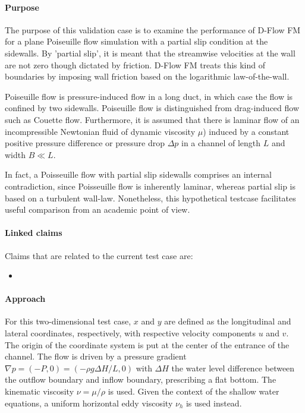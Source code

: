 

\paragraph*{Purpose}
The purpose of this validation case is to examine the performance of D-Flow FM for a plane Poiseuille flow simulation with a partial slip condition at the sidewalls. By 'partial slip', it is meant that the streamwise velocities at the wall are not zero though dictated by friction. D-Flow FM treats this kind of boundaries by imposing wall friction based on the logarithmic law-of-the-wall. 

Poiseuille flow is pressure-induced flow in a long duct, in which case the flow is confined by two sidewalls. Poiseuille flow is distinguished from drag-induced flow such as Couette flow. Furthermore, it is assumed that there is laminar flow of an incompressible Newtonian fluid of dynamic viscosity $\mu$) induced by a constant positive pressure difference or pressure drop $\Delta p$ in a channel of length $L$ and width $B \ll L$. 

In fact, a Poisseuille flow with partial slip sidewalls comprises an internal contradiction, since Poisseuille flow is inherently laminar, whereas partial slip is based on a turbulent wall-law. Nonetheless, this hypothetical testcase facilitates useful comparison from an academic point of view.


\paragraph*{Linked claims}
Claims that are related to the current test case are:
\begin{itemize}
\item {}
\end{itemize}


\paragraph*{Approach}
For this two-dimensional test case, $x$ and $y$ are defined as the longitudinal and lateral coordinates, respectively, with respective velocity components $u$ and $v$. The origin of the coordinate system is put at the center of the entrance of the channel. The flow is driven by a pressure gradient $\nabla p = (-P,0) = (-\rho g \Delta H / L,0)$ with $\Delta H$ the water level difference between the outflow boundary and inflow boundary, prescribing a flat bottom. The kinematic viscosity $\nu = \mu/\rho$ is used. Given the context of the shallow water equations, a uniform horizontal eddy viscosity $\nu_h$ is used instead.

